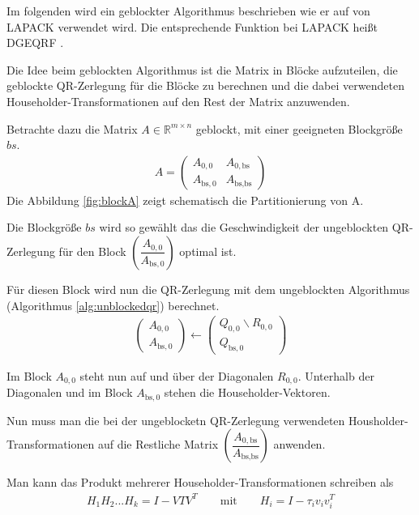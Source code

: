 Im folgenden wird ein geblockter Algorithmus beschrieben wie er auf von LAPACK verwendet wird. Die entsprechende Funktion bei LAPACK heißt \glqq DGEQRF\grqq{} \cite{DGEQRF}.

Die Idee beim geblockten Algorithmus ist die Matrix in Blöcke aufzuteilen, die geblockte QR-Zerlegung für die Blöcke zu berechnen und die dabei verwendeten Householder-Transformationen auf den Rest der Matrix anzuwenden.


Betrachte dazu die Matrix $A \in \mathbb{R}^{m \times n}$ geblockt, mit einer geeigneten Blockgröße $bs$.
\begin{align}
	A = \left(\begin{array}{l|l}
	A_{0, 0} & A_{0, \text{bs}} \\ \hline
	A_{\text{bs}, 0}   & A_{\text{bs}, \text{bs}} 	
	\end{array} \right) \label{equ:blockA}
\end{align}
Die Abbildung \ref{fig:blockA} zeigt schematisch die Partitionierung von A.

Die Blockgröße $bs$ wird so gewählt das die Geschwindigkeit der ungeblockten QR-Zerlegung für den Block $ \left(\dfrac{A_{0, 0}}{A_{\text{bs}, 0}} \right)$ optimal ist.

Für diesen Block wird nun die  QR-Zerlegung mit dem ungeblockten Algorithmus (Algorithmus \ref{alg:unblockedqr}) berechnet.
\begin{align}
	\left(\begin{array}{l} 
	A_{0, 0} \\ \hline
	A_{\text{bs}, 0}
	\end{array}\right)
	\leftarrow
	\left(\begin{array}{l} 
	Q_{0, 0}  \backslash R_{0,0} \\ \hline
	Q_{\text{bs}, 0} 
	\end{array}\right)
\end{align}

Im Block $A_{0, 0}$ steht nun auf und über der Diagonalen $R_{0,0}$. Unterhalb der Diagonalen und im Block $A_{\text{bs}, 0}$ stehen die Householder-Vektoren.

Nun muss man die bei der ungeblocketn QR-Zerlegung verwendeten Housholder-Transformationen auf die Restliche Matrix $ \left(\dfrac{A_{0, \text{bs}}}{A_{\text{bs}, \text{bs}}} \right)$ anwenden.



Man kann das Produkt mehrerer Householder-Transformationen schreiben als
\begin{align*}
H_1H_2...H_k = I - VTV^T \qquad \text{mit}\qquad H_i = I - \tau_i v_iv_i^T
\end{align*} \cite{Joffrain:2006:AHT:1141885.1141886}

